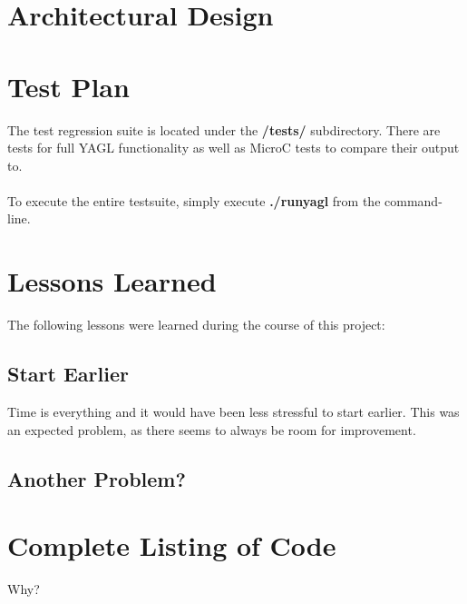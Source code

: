 \documentclass[12pt]{article}
\begin{document}
\section{Architectural Design}
\section{Test Plan}
The test regression suite is located under the \textbf{/tests/} subdirectory. There are tests for full YAGL functionality as well as MicroC tests to compare their output to.\\\\

To execute the entire testsuite, simply execute \textbf{./runyagl} from the command-line.

\section{Lessons Learned}
The following lessons were learned during the course of this project:\\

\subsection{Start Earlier}
Time is everything and it would have been less stressful to start earlier. This was an expected problem, as there seems to always be room for improvement.

\subsection{Another Problem?}


\section{Complete Listing of Code}
Why?
\end{document}
